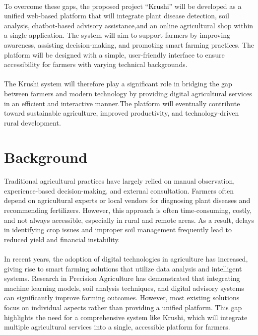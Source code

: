 \paragraph{}To overcome these gaps, the proposed project “Krushi” will be developed as a unified web-based platform that will integrate plant disease detection, soil analysis, chatbot-based advisory assistance,and an online agricultural shop within a single application. The system will aim to support farmers by improving awareness, assisting decision-making, and promoting smart farming practices. The platform will be designed with a simple, user-friendly interface to ensure accessibility for farmers with varying technical backgrounds.\cite{3}
\paragraph{}The Krushi system will therefore play a significant role in bridging the gap between farmers and modern technology by providing digital agricultural services in an efficient and interactive manner.The platform will eventually contribute toward sustainable agriculture, improved productivity, and technology-driven rural development.\cite{6}




\section{Background}
\paragraph{}Traditional agricultural practices have largely relied on manual observation, experience-based decision-making, and external consultation. Farmers often depend on agricultural experts or local vendors for diagnosing plant diseases and recommending fertilizers. However, this approach is often time-consuming, costly, and not always accessible, especially in rural and remote areas. As a result, delays in identifying crop issues and improper soil management frequently lead to reduced yield and financial instability.\cite{3}\cite{4} 
\paragraph{}In recent years, the adoption of digital technologies in agriculture has increased, giving rise to smart farming solutions that utilize data analysis and intelligent systems. Research in Precision Agriculture has demonstrated that integrating machine learning models, soil analysis techniques, and digital advisory systems can significantly improve farming outcomes. However, most existing solutions focus on individual aspects rather than providing a unified platform. This gap highlights the need for a comprehensive system like Krushi, which will integrate multiple agricultural services into a single, accessible platform for farmers.

